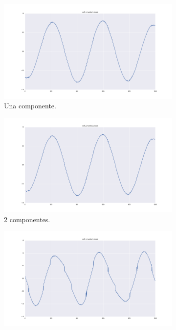 \documentclass[11pt,spanish,listoffigures,listoftables]{tfgetsinf}
\begin{document}
    \begin{figure}[H]
        \begin{subfigure}[h]{0.33\textwidth}
            \centering
            \includegraphics[width=\textwidth]{simulated_data_8_columns/col5_inverted_nipals_1.png}
            \caption{Una componente.}
            \label{fig:col5_inverted_nipals1}
        \end{subfigure}
        \begin{subfigure}[h]{0.33\textwidth}
            \centering
            \includegraphics[width=\textwidth]{simulated_data_8_columns/col5_inverted_nipals_2.png}
            \caption{2 componentes.}
            \label{fig:col5_inverted_nipals2}
        \end{subfigure}
        \begin{subfigure}[h]{0.33\textwidth}
            \centering
            \includegraphics[width=\textwidth]{simulated_data_8_columns/col5_inverted_nipals_3.png}

\end{subfigure}
\end{figure}
\end{document}
